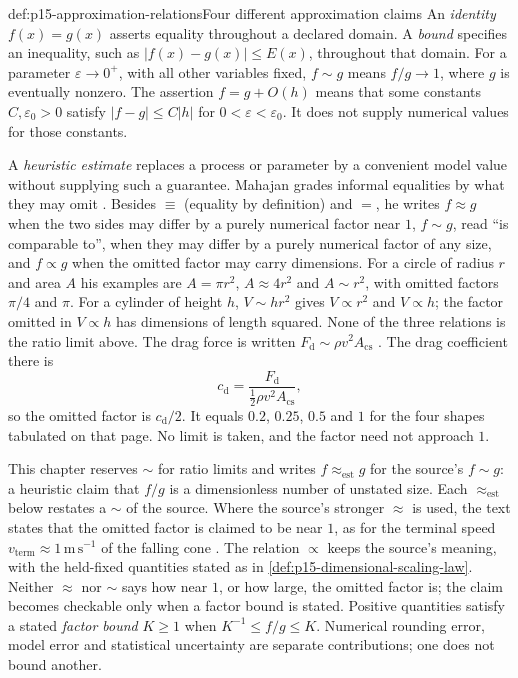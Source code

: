 \begin{hbdefinition}{def:p15-approximation-relations}{Four different approximation claims}
An \emph{identity} \(f(x)=g(x)\) asserts equality throughout a declared domain.
A \emph{bound} specifies an inequality, such as
\(|f(x)-g(x)|\leq E(x)\), throughout that domain.
For a parameter \(\varepsilon\to0^+\), with all other variables fixed,
\(f\sim g\) means \(f/g\to1\), where \(g\) is eventually nonzero.
The assertion \(f=g+O(h)\) means that some constants \(C,\varepsilon_0>0\)
satisfy \(|f-g|\leq C|h|\) for \(0<\varepsilon<\varepsilon_0\).
It does not supply numerical values for those constants.

A \emph{heuristic estimate} replaces a process or parameter by a convenient
model value without supplying such a guarantee. Mahajan grades informal
equalities by what they may omit
\cite[Sec.~1.1, p.~5]{Mahajan2014Insight}. Besides \(\equiv\) (equality by
definition) and \(=\), he writes \(f\approx g\) when the two sides may differ
by a purely numerical factor near \(1\), \(f\sim g\), read ``is comparable
to'', when they may differ by a purely numerical factor of any size, and
\(f\propto g\) when the omitted factor may carry dimensions. For a circle of
radius \(r\) and area \(A\) his examples are \(A=\pi r^2\), \(A\approx4r^2\)
and \(A\sim r^2\), with omitted factors \(\pi/4\) and \(\pi\). For a cylinder
of height \(h\), \(V\sim hr^2\) gives \(V\propto r^2\) and \(V\propto h\);
the factor omitted in \(V\propto h\) has dimensions of length squared.
None of the three relations is the ratio limit above. The drag force is
written \(F_{\mathrm d}\sim\rho v^2A_{\mathrm{cs}}\)
\cite[Sec.~8.3, p.~297, eq.~(8.33)]{Mahajan2014Insight}. The drag
coefficient there is
\[
 c_{\mathrm d}=\frac{F_{\mathrm d}}{\frac12\rho v^2A_{\mathrm{cs}}},
\]
so the omitted factor is \(c_{\mathrm d}/2\). It equals \(0.2\), \(0.25\),
\(0.5\) and \(1\) for the four shapes tabulated on that page. No limit is
taken, and the factor need not approach \(1\).

This chapter reserves \(\sim\) for ratio limits and writes
\(f\approx_{\mathrm{est}}g\) for the source's \(f\sim g\): a heuristic claim
that \(f/g\) is a dimensionless number of unstated size. Each
\(\approx_{\mathrm{est}}\) below restates a \(\sim\) of the source. Where the
source's stronger \(\approx\) is used, the text states that the omitted factor
is claimed to be near \(1\), as for the terminal speed
\(v_{\mathrm{term}}\approx1\,\mathrm{m\,s^{-1}}\) of the falling cone
\cite[Sec.~6.4, p.~218]{Mahajan2014Insight}. The relation \(\propto\) keeps
the source's meaning, with the held-fixed quantities stated as in
\cref{def:p15-dimensional-scaling-law}. Neither \(\approx\) nor \(\sim\) says
how near \(1\), or how large, the omitted factor is; the claim becomes
checkable only when a factor bound is stated.
Positive quantities satisfy a stated \emph{factor bound} \(K\geq1\) when
\(K^{-1}\leq f/g\leq K\). Numerical rounding error, model error and statistical
uncertainty are separate contributions; one does not bound another.
\end{hbdefinition}

